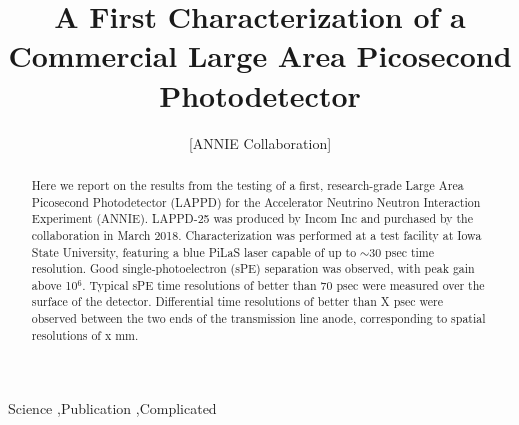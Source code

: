 \documentclass[preprint,12pt]{elsarticle}
\begin{document}
\begin{frontmatter}


\title{A First Characterization of a Commercial Large Area Picosecond Photodetector}




\author{[ANNIE Collaboration]}

\address{Everytown, United States}

\begin{abstract}
Here we report on the results from the testing of a first, research-grade Large Area Picosecond Photodetector (LAPPD) for the Accelerator Neutrino Neutron Interaction Experiment (ANNIE). LAPPD-25 was produced by Incom Inc and purchased by the collaboration in March 2018. Characterization was performed at a test facility at Iowa State University, featuring a blue PiLaS laser capable of up to $\sim$30 psec time resolution. Good single-photoelectron (sPE) separation was observed, with peak gain above 10$^6$. Typical sPE time resolutions of better than 70 psec were measured over the surface of the detector. Differential time resolutions of better than X psec were observed between the two ends of the transmission line anode, corresponding to spatial resolutions of x mm. 
\end{abstract}

\begin{keyword}
Science \sep Publication \sep Complicated


\end{keyword}

\end{frontmatter}
\end{document}
